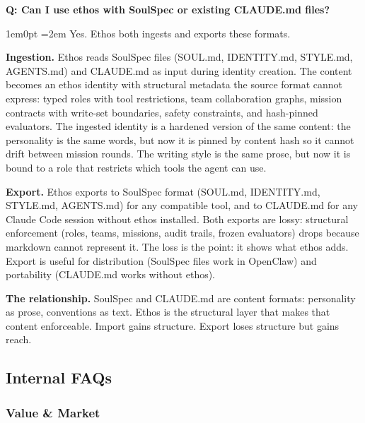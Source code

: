 \documentclass[11pt,letterpaper]{article}
\newcounter{faqnum}
\newenvironment{faqpair}[1]{%
  \needspace{4\baselineskip}%
  \vspace{0.5em}%
  \refstepcounter{faqnum}%
  \noindent\textbf{\color{SectionBlue}Q\thefaqnum: #1}\par\nopagebreak[4]%
  \vspace{0.2em}%
  \begin{adjustwidth}{1em}{0pt}%
  \setlength{\parindent}{0pt}%
  \emergencystretch=2em%
}{%
  \end{adjustwidth}%
  \vspace{0.5em}%
}
\begin{document}
\begin{faqpair}{Can I use ethos with SoulSpec or existing CLAUDE.md files?}\label{faq:interop}
Yes. Ethos both ingests and exports these formats.

\textbf{Ingestion.} Ethos reads SoulSpec files (SOUL.md, IDENTITY.md, STYLE.md, AGENTS.md) and CLAUDE.md as input during identity creation. The content becomes an ethos identity with structural metadata the source format cannot express: typed roles with tool restrictions, team collaboration graphs, mission contracts with write-set boundaries, safety constraints, and hash-pinned evaluators. The ingested identity is a hardened version of the same content: the personality is the same words, but now it is pinned by content hash so it cannot drift between mission rounds. The writing style is the same prose, but now it is bound to a role that restricts which tools the agent can use.

\textbf{Export.} Ethos exports to SoulSpec format (SOUL.md, IDENTITY.md, STYLE.md, AGENTS.md) for any compatible tool, and to CLAUDE.md for any Claude Code session without ethos installed. Both exports are lossy: structural enforcement (roles, teams, missions, audit trails, frozen evaluators) drops because markdown cannot represent it. The loss is the point: it shows what ethos adds. Export is useful for distribution (SoulSpec files work in OpenClaw) and portability (CLAUDE.md works without ethos).

\textbf{The relationship.} SoulSpec and CLAUDE.md are content formats: personality as prose, conventions as text. Ethos is the structural layer that makes that content enforceable. Import gains structure. Export loses structure but gains reach.
\end{faqpair}

\newpage
\subsection*{Internal FAQs}

\subsubsection*{Value \& Market}
\end{document}
